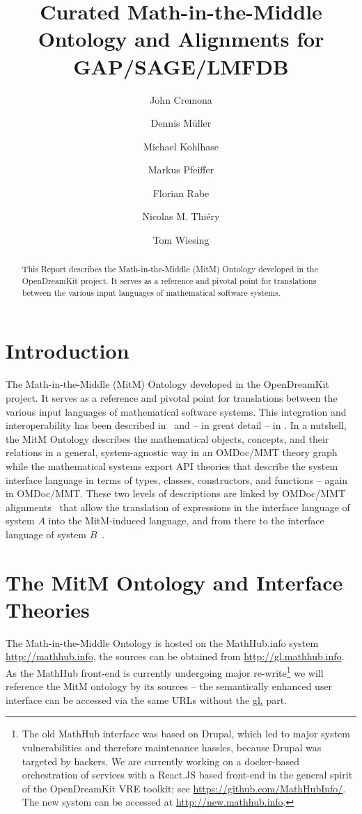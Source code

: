 \documentclass{deliverablereport}
\title{Curated Math-in-the-Middle Ontology and Alignments for GAP/SAGE/LMFDB}
\author{John Cremona}
\author{Dennis M\"uller}
\author{Michael Kohlhase}
\author{Markus Pfeiffer}
\author{Florian Rabe}
\author{Nicolas M. Thiéry}
\author{Tom Wiesing}
\begin{document}
\maketitle
\begin{abstract}
  This Report describes the Math-in-the-Middle (MitM) Ontology developed in the
  OpenDreamKit project. It serves as a reference and pivotal point for translations
  between the various input languages of mathematical software systems. 
\end{abstract}
\tableofcontents\newpage

\section{Introduction}

The Math-in-the-Middle (MitM) Ontology developed in the OpenDreamKit project. It serves as
a reference and pivotal point for translations between the various input languages of
mathematical software systems. This integration and interoperability has been described
in~\cite{DehKohKon:iop16,WieKohRab:vtuimkb17,KohMuePfe:kbimss17} and -- in great detail --
in \cite{ODK-D6.5}. In a nutshell, the MitM Ontology describes the mathematical objects,
concepts, and their relations in a general, system-agnostic way in an OMDoc/MMT theory
graph while the mathematical systems export API theories that describe the system
interface language in terms of types, classes, constructors, and functions -- again in
OMDoc/MMT. These two levels of descriptions are linked by OMDoc/MMT
alignments~\cite{MueGauKal:cacfms17} that allow the translation of expressions in the
interface language of system $A$ into the MitM-induced language, and from there to the
interface language of system $B$~\cite{MueRoYuRa:abtafs17}.

\section{The MitM Ontology and Interface Theories}

The Math-in-the-Middle Ontology is hosted on the MathHub.info system
\url{http://mathhub.info}, the sources can be obtained from
\url{http://gl.mathhub.info}. As the MathHub front-end is currently undergoing major
re-write\footnote{The old MathHub interface was based on Drupal, which led to major system
  vulnerabilities and therefore maintenance hassles, because Drupal was targeted by
  hackers. We are currently working on a docker-based orchestration of services with a
  React.JS based front-end in the general spirit of the OpenDreamKit VRE toolkit; see
  \url{https://github.com/MathHubInfo/}. The new system can be accessed at
  \url{http://new.mathhub.info}.} we will reference the MitM ontology by its sources --
the semantically enhanced user interface can be accessed via the same URLs without the
\url{gl.} part.
\end{document}
